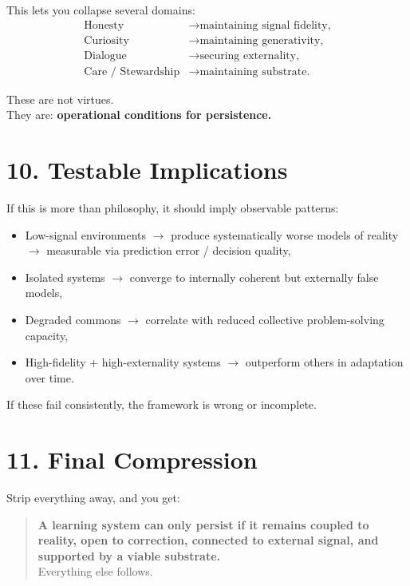 \documentclass[11pt, a4paper]{article}
\begin{document}
This lets you collapse several domains:
\begin{align*}
    \text{Honesty} &\rightarrow \text{maintaining signal fidelity,} \\
    \text{Curiosity} &\rightarrow \text{maintaining generativity,} \\
    \text{Dialogue} &\rightarrow \text{securing externality,} \\
    \text{Care / Stewardship} &\rightarrow \text{maintaining substrate.}
\end{align*}

These are not virtues. \\
They are: \textbf{operational conditions for persistence.}

\section*{10. Testable Implications}

If this is more than philosophy, it should imply observable patterns:
\begin{itemize}
    \item Low-signal environments $\rightarrow$ produce systematically worse models of reality $\rightarrow$ measurable via prediction error / decision quality,
    \item Isolated systems $\rightarrow$ converge to internally coherent but externally false models,
    \item Degraded commons $\rightarrow$ correlate with reduced collective problem-solving capacity,
    \item High-fidelity + high-externality systems $\rightarrow$ outperform others in adaptation over time.
\end{itemize}

If these fail consistently, the framework is wrong or incomplete.

\section*{11. Final Compression}

Strip everything away, and you get:
\begin{quote}
    \textbf{A learning system can only persist if it remains coupled to reality, open to correction, connected to external signal, and supported by a viable substrate.} \\
    Everything else follows.
\end{quote}
\end{document}
